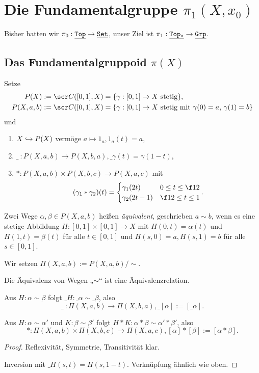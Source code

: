 \chapter{Die Fundamentalgruppe \texorpdfstring{$\pi_1(X, x_0)$}{π₁(X, x₀)}}



Bisher hatten wir $\pi_0: \underline{\mathtt{Top}} \to \underline{\mathtt{Set}}$, unser Ziel ist $\pi_1: \underline{\mathtt{Top_*}} \to \underline{\mathtt{Grp}}$.


\section{Das Fundamentalgruppoid $\pi(X)$}


\begin{df}
	Setze
	\begin{align*}
		P(X) &:= \scr C([0,1], X) = \{ \gamma : [0,1] \to X \text{ stetig} \}, \\
		P(X,a,b) &:= \scr C([0,1], X) = \{ \gamma : [0,1] \to X \text{ stetig mit $\gamma(0) = a$, $\gamma(1) = b$} \}
	\end{align*}
	und
	\begin{enumerate}[(1)]
		\item
			$X \hookrightarrow P(X)$ vermöge $a \mapsto 1_a, 1_a(t) = a$,
		\item
			$\_{\ }:P(X,a,b) \to P(X,b,a), \_\gamma(t) = \gamma(1-t)$,
		\item
			$*: P(X,a,b) \times P(X,b,c) \to P(X,a,c)$ mit
			\[
				(\gamma_1 * \gamma_2)(t) = \begin{cases}
					\gamma_1(2t) & 0 \le t \le \f 12 \\
					\gamma_2(2t-1) & \f 12 \le t \le 1
				\end{cases}.
			\]
	\end{enumerate}
\end{df}

\begin{df}
	Zwei Wege $\alpha, \beta \in P(X,a,b)$ heißen \emph{äquivalent}, geschrieben $a \sim b$, wenn es eine stetige Abbildung $H: [0,1] \times [0,1] \to X$ mit $H(0,t) = \alpha(t)$ und $H(1,t) = \beta(t)$ für alle $t \in [0,1]$ und $H(s,0) = a, H(s, 1) = b$ für alle $s \in [0,1]$.

	Wir setzen $\Pi(X,a,b) := P(X,a,b) / \sim$.
\end{df}



\begin{prop}
	Die Äquivalenz von Wegen „$\sim$“ ist eine Äquivalenzrelation.

	Aus $H: \alpha \sim \beta$ folgt $\_H: \_\alpha \sim \_\beta$, also
	\[
		\_{\ }: \Pi(X, a, b) \to \Pi(X, b, a), \_{[\alpha]} := [\_\alpha].
	\]

	Aus $H: \alpha \sim \alpha'$ und $K: \beta \sim \beta'$ folgt $H*K: \alpha * \beta \sim \alpha'*\beta'$, also
	\[
		*: \Pi(X, a, b) \times \Pi(X, b, c) \to \Pi(X, a, c), [\alpha] * [\beta] := [\alpha * \beta].
	\]
	\begin{proof}
		Reflexivität, Symmetrie, Transitivität klar.

		Inversion mit $\_H(s,t) = H(s,1-t)$.
		Verknüpfung ähnlich wie oben.
	\end{proof}
\end{prop}

